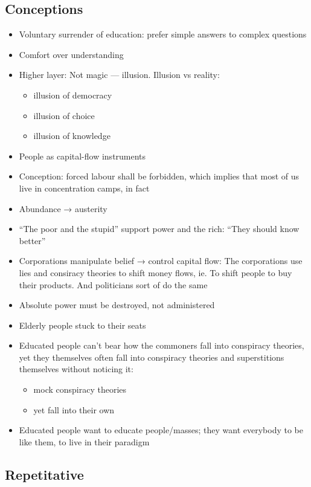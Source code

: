 \documentclass[12pt]{article}
\begin{document}
\subsection{Conceptions}
\begin{itemize}
  \item Voluntary surrender of education: prefer simple answers to complex questions
  \item Comfort over understanding
  \item Higher layer: Not magic — illusion. Illusion vs reality:
  \begin{itemize}
    \item illusion of democracy
    \item illusion of choice
    \item illusion of knowledge
  \end{itemize}
  \item People as capital-flow instruments
  \item Conception: forced labour shall be forbidden, which implies that most of us live in concentration camps, in fact
  \item Abundance → austerity
  \item “The poor and the stupid” support power and the rich: “They should know better”
  \item Corporations manipulate belief → control capital flow: The corporations use lies and consiracy theories to shift money flows, ie. To shift people to buy their products. And politicians sort of do the same
  \item Absolute power must be destroyed, not administered
  \item Elderly people stuck to their seats
  \item Educated people can’t bear how the commoners fall into conspiracy theories, yet they themselves often fall into conspiracy theories and superstitions themselves without noticing it:
  \begin{itemize}
    \item mock conspiracy theories
    \item yet fall into their own
  \end{itemize}
  \item Educated people want to educate people/masses; they want everybody to be like them, to live in their paradigm
\end{itemize}

\subsection{Repetitative}
\end{document}
